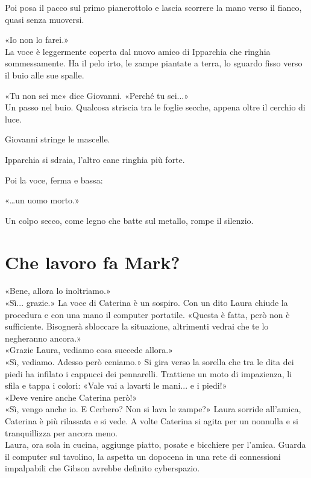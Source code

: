 \documentclass[10pt,oneside]{extbook}
\begin{document}
Poi posa il pacco sul primo pianerottolo e lascia scorrere la mano verso il fianco, quasi senza muoversi.

«Io non lo farei.»\\

La voce \`e leggermente coperta   dal nuovo amico di Ipparchia che ringhia sommessamente. Ha il pelo irto, le zampe piantate a terra, lo sguardo fisso verso il buio alle sue spalle.

«Tu non sei me» dice Giovanni. «Perché tu sei...»\\

Un passo nel buio. Qualcosa striscia tra le foglie secche, appena oltre il cerchio di luce.

Giovanni stringe le mascelle.

Ipparchia si sdraia, l’altro cane ringhia pi\`u forte.

Poi la voce, ferma e bassa:

«…un uomo morto.»

Un colpo secco, come legno che batte sul metallo, rompe il silenzio.

\clearpage{}
\clearpage{}\chapter{Che lavoro fa Mark?}
«Bene, allora lo inoltriamo.»\\
«Sì... grazie.» La voce di Caterina \`e un sospiro. Con un dito Laura chiude la procedura e con una mano il computer portatile. «Questa \`e fatta, per\`o non \`e sufficiente. Bisognerà sbloccare la situazione, altrimenti vedrai che te lo negheranno ancora.»\\
«Grazie Laura, vediamo cosa succede allora.»\\
«Sì, vediamo. Adesso per\`o ceniamo.» Si gira verso la sorella che  tra le dita dei piedi ha infilato  i cappucci dei pennarelli. Trattiene un moto di impazienza, li sfila  e  tappa i colori:  «Vale vai a lavarti le mani... e i piedi!»\\
«Deve venire anche Caterina per\`o!»\\
«Sì, vengo anche  io. E Cerbero? Non si lava le zampe?» Laura sorride all'amica, Caterina \`e pi\`u rilassata e si vede. A volte Caterina si agita per un nonnulla e si tranquillizza per ancora meno.\\
Laura, ora sola in cucina, aggiunge piatto, posate e bicchiere per l'amica. Guarda il computer sul tavolino, la aspetta un dopocena in una rete di connessioni impalpabili che Gibson avrebbe definito cyberspazio.
\end{document}

